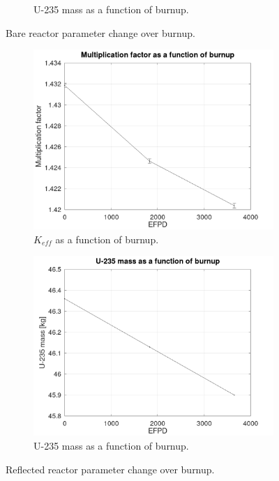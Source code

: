 \documentclass[11pt,letterpaper]{article}
\begin{document}
\begin{figure}[htbp!]
\begin{subfigure}[t]{0.4\textwidth}
		\caption{U-235 mass as a function of burnup.}
	\end{subfigure}
	\hfill
	\caption{Bare reactor parameter change over burnup.}
	\label{fig:results-bare2}
\end{figure}

\begin{figure}[htbp!]
	\centering
	\begin{subfigure}[t]{0.4\textwidth}
		\centering
		\includegraphics[width=\linewidth]{figures/reflector2-Keff.png}
		\caption{$K_{eff}$ as a function of burnup.}
	\end{subfigure}
	\begin{subfigure}[t]{0.4\textwidth}
		\centering
		\includegraphics[width=\linewidth]{figures/reflector2-mU235.png}
		\caption{U-235 mass as a function of burnup.}
	\end{subfigure}
	\hfill
	\caption{Reflected reactor parameter change over burnup.}
	\label{fig:results-reflector2}
\end{figure}

\pagebreak


\end{document}
